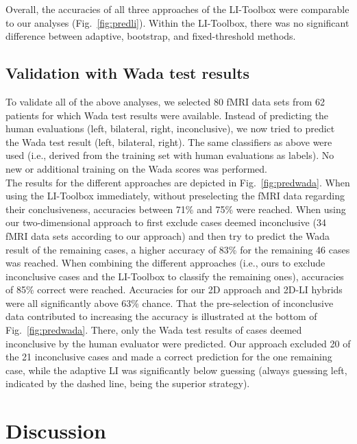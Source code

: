 \documentclass[fleqn,10pt]{SelfArx} %
\begin{document}
Overall, the accuracies of all three approaches of the LI-Toolbox were comparable to our analyses (Fig.~\ref{fig:predli}). Within the LI-Toolbox, there was no significant difference between adaptive, bootstrap, and fixed-threshold methods.

\subsection{Validation with Wada test results}
To validate all of the above analyses, we selected 80 fMRI data sets from 62 patients for which Wada test results were available. Instead of predicting the human evaluations (left, bilateral, right, inconclusive), we now tried to predict the Wada test result (left, bilateral, right). The same classifiers as above were used (i.e., derived from the training set with human evaluations as labels). No new or additional training on the Wada scores was performed.\\
The results for the different approaches are depicted in Fig.~\ref{fig:predwada}. When using the LI-Toolbox immediately, without preselecting the fMRI data regarding their conclusiveness, accuracies between 71\% and 75\% were reached. When using our two-dimensional approach to first exclude cases deemed inconclusive (34 fMRI data sets according to our approach) and then try to predict the Wada result of the remaining cases, a higher accuracy of 83\% for the remaining 46 cases was reached. When combining the different approaches (i.e., ours to exclude inconclusive cases and the LI-Toolbox to classify the remaining ones), accuracies of 85\% correct were reached. Accuracies for our 2D approach and 2D-LI hybrids were all significantly above 63\% chance. That the pre-selection of inconclusive data contributed to increasing the accuracy is illustrated at the bottom of Fig.~\ref{fig:predwada}. There, only the Wada test results of cases deemed inconclusive by the human evaluator were predicted. Our approach excluded 20 of the 21 inconclusive cases and made a correct prediction for the one remaining case, while the adaptive LI was significantly below guessing (always guessing left, indicated by the dashed line, being the superior strategy).

\section{Discussion}
\end{document}
